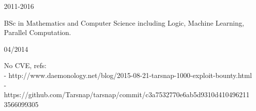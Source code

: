 \documentclass[11pt]{article} %
\begin{document}

\begin{description}
\squish
{}
           {}
           {2011-2016}

           BSc in Mathematics and Computer Science including Logic, Machine Learning, Parallel Computation.

\end{description}


\begin{description}
\squish
{}
           {}
           {04/2014}

No CVE, refs: \\
   - http://www.daemonology.net/blog/2015-08-21-tarsnap-1000-exploit-bounty.html \\
   - https://github.com/Tarsnap/tarsnap/commit/c3a7532770e6ab5d9310d4104962113566099305 \\
\end{description}

%

%

%

%

%

%

%

%

%

%

\end{document}
